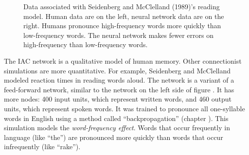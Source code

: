\begin{figure}[h]
\centering
{}
\caption[From McClelland and Seidenberg, 1989 \cite{seidenberg1989distributed}. Redrawn by Pamela Payne.]{Data associated with Seidenberg and McClelland (1989)'s reading model. Human data are on the left, neural network data are on the right. Humans pronounce high-frequency words more quickly than low-frequency words. The neural network makes fewer errors on high-frequency than low-frequency words.}
\label{regularityData}
\end{figure}
 
The IAC network is a qualitative model of human memory. Other connectionist simulations are more quantitative. For example, Seidenberg and McClelland modeled reaction times in reading words aloud. The network is a variant of a feed-forward network, similar to the network on the left side of figure . It has more nodes: 400 input units, which represent written words, and 460 output units, which represent spoken words. It was trained to pronounce all one-syllable words in English using a method called ``backpropagation'' (chapter ). This simulation models the \emph{word-frequency effect}. Words that occur frequently in language (like ``the'') are pronounced more quickly than words that occur infrequently (like ``rake'').

